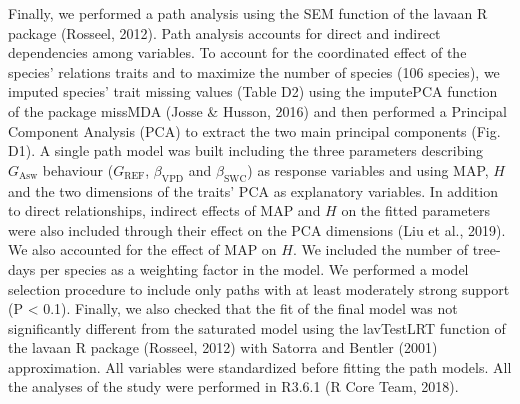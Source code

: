 \documentclass[11pt,twoside]{reedthesis}
\begin{document}
Finally, we performed a path analysis using the SEM function of the
lavaan R package (Rosseel, 2012). Path analysis accounts for direct and
indirect dependencies among variables. To account for the coordinated
effect of the species' relations traits and to maximize the number of
species (106 species), we imputed species' trait missing values (Table
D2) using the imputePCA function of the package missMDA (Josse \&
Husson, 2016) and then performed a Principal Component Analysis (PCA) to
extract the two main principal components (Fig. D1). A single path model
was built including the three parameters describing \(G_{\text{Asw}}\)
behaviour (\(G_{\text{REF}}\), \(\beta_{\text{VPD}}\) and
\(\beta_{\text{SWC}}\)) as response variables and using MAP, \(H\) and
the two dimensions of the traits' PCA as explanatory variables. In
addition to direct relationships, indirect effects of MAP and \(H\) on
the fitted parameters were also included through their effect on the PCA
dimensions (Liu et al., 2019). We also accounted for the effect of MAP
on \(H\). We included the number of tree-days per species as a weighting
factor in the model. We performed a model selection procedure to include
only paths with at least moderately strong support (P \textless{} 0.1).
Finally, we also checked that the fit of the final model was not
significantly different from the saturated model using the lavTestLRT
function of the lavaan R package (Rosseel, 2012) with Satorra and
Bentler (2001) approximation. All variables were standardized before
fitting the path models. All the analyses of the study were performed in
R3.6.1 (R Core Team, 2018).\par
\end{document}
